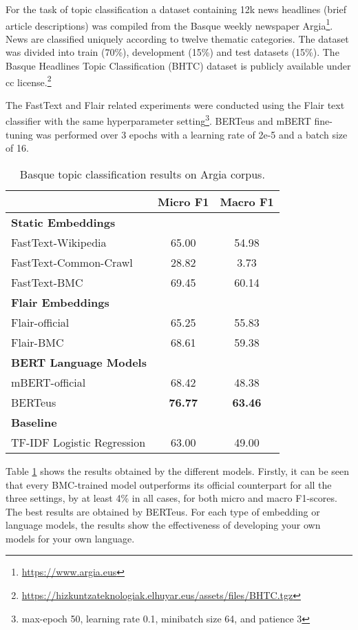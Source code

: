 \documentclass[10pt, a4paper]{article}
\begin{document}
For the task of topic classification a dataset containing 12k news headlines (brief article descriptions) was compiled from the Basque weekly newspaper Argia\footnote{\scriptsize \url{https://www.argia.eus}}. News are classified uniquely according to twelve thematic categories. The dataset was divided into train (70\%), development (15\%) and test datasets (15\%). The Basque Headlines Topic Classification (BHTC) dataset is publicly available under cc license.\footnote{\scriptsize \url{https://hizkuntzateknologiak.elhuyar.eus/assets/files/BHTC.tgz}}

The FastText and Flair related experiments were conducted using the Flair text classifier with the same hyperparameter setting\footnote{max-epoch 50, learning rate 0.1, minibatch size 64, and  patience 3 }. BERTeus and mBERT fine-tuning was performed over 3 epochs with a learning rate of 2e-5 and a batch size of 16.

\begin{table}[!ht]\small
\centering
\begin{tabular}{@{\hspace{0.3cm}}lcc} \hline
 {\textbf{}} & {\textbf{Micro F1}} &  {\textbf{Macro F1}} \\ \hline
\textbf{Static Embeddings} & & \\
FastText-Wikipedia & 65.00 & 54.98 \\
FastText-Common-Crawl & 28.82 & 3.73  \\
FastText-BMC  & 69.45 & 60.14 \\
\hline%
\textbf{Flair Embeddings}\\
Flair-official & 65.25 & 55.83 \\
Flair-BMC  & 68.61 & 59.38  \\ \hline
\textbf{BERT Language Models}\\
mBERT-official  & 68.42 & 48.38  \\
BERTeus  & \textbf{76.77}	& \textbf{63.46}  \\
\hline
\textbf{Baseline} \\
TF-IDF Logistic Regression & 63.00 & 49.00 \\
\hline
\end{tabular}
\caption{Basque topic classification results on Argia corpus.}\label{tab:topic}
\end{table}

Table \ref{tab:topic} shows the results obtained by the different models. Firstly, it can be seen that every BMC-trained model outperforms its official counterpart for all the three settings, by at least 4\% in all cases, for both micro and macro F1-scores. The best results are obtained by BERTeus. For each type of embedding or language models, the results show the effectiveness of developing your own models for your own language.
\end{document}
